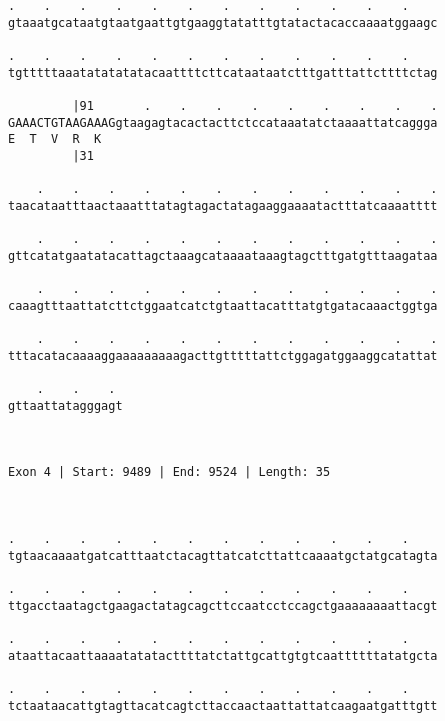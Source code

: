\documentclass{article}
\begin{document}
\begin{Verbatim}
.    .    .    .    .    .    .    .    .    .    .    .    
gtaaatgcataatgtaatgaattgtgaaggtatatttgtatactacaccaaaatggaagc
                                                            
.    .    .    .    .    .    .    .    .    .    .    .    
tgtttttaaatatatatatacaattttcttcataataatctttgatttattcttttctag
                                                            
         |91       .    .    .    .    .    .    .    .    .
GAAACTGTAAGAAAGgtaagagtacactacttctccataaatatctaaaattatcaggga
E  T  V  R  K                                               
         |31                                                
  
    .    .    .    .    .    .    .    .    .    .    .    .
taacataatttaactaaatttatagtagactatagaaggaaaatactttatcaaaatttt
                                                            
    .    .    .    .    .    .    .    .    .    .    .    .
gttcatatgaatatacattagctaaagcataaaataaagtagctttgatgtttaagataa
                                                            
    .    .    .    .    .    .    .    .    .    .    .    .
caaagtttaattatcttctggaatcatctgtaattacatttatgtgatacaaactggtga
                                                            
    .    .    .    .    .    .    .    .    .    .    .    .
tttacatacaaaaggaaaaaaaaagacttgtttttattctggagatggaaggcatattat
                                                            
    .    .    . 
gttaattatagggagt
                
                
 
Exon 4 | Start: 9489 | End: 9524 | Length: 35



.    .    .    .    .    .    .    .    .    .    .    .    
tgtaacaaaatgatcatttaatctacagttatcatcttattcaaaatgctatgcatagta
                                                            
.    .    .    .    .    .    .    .    .    .    .    .    
ttgacctaatagctgaagactatagcagcttccaatcctccagctgaaaaaaaattacgt
                                                            
.    .    .    .    .    .    .    .    .    .    .    .    
ataattacaattaaaatatatacttttatctattgcattgtgtcaattttttatatgcta
                                                            
.    .    .    .    .    .    .    .    .    .    .    .    
tctaataacattgtagttacatcagtcttaccaactaattattatcaagaatgatttgtt
                                                            

\end{Verbatim}
\end{document}
